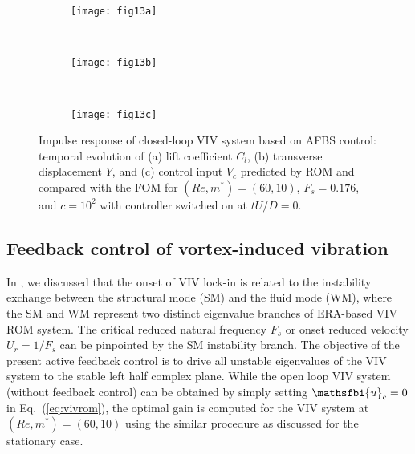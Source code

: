 \documentclass[standard]{jfm}
\begin{document}
\begin{figure}
\centering
\begin{subfigure}[b]{\columnwidth}
\centering
  \texttt{[image: fig13a]}
    \caption{}
    \label{fig:viv_val_cl} 
    \end{subfigure}  \\
\begin{subfigure}[b]{\columnwidth}
\centering
  \texttt{[image: fig13b]}
    \caption{}
    \label{fig:viv_val_y} 
    \end{subfigure}   \\
\begin{subfigure}[b]{\columnwidth} 
\centering
  \texttt{[image: fig13c]}
	\caption{}
	\label{fig:viv_val_uc}
	\end{subfigure}	
        \caption{Impulse response of closed-loop VIV system based on AFBS control: temporal evolution of 
        (a) lift coefficient $C_l$, 
        (b) transverse displacement $Y$, and 
        (c) control input $V_c$ predicted by ROM and compared with the FOM 
        for $(Re,m^*)=(60,10)$, $F_s=0.176$, and $c=10^2$ with controller switched on at $tU/D=0$.}
        \label{fig:viv_val}
\end{figure}

\subsection{Feedback control of vortex-induced vibration}\label{sec:VIV}
In \cite{YaoJFM2016}, we discussed that the onset of VIV lock-in is related to 
the instability exchange between the structural mode (SM) and the fluid mode (WM),
where the SM and WM represent two distinct eigenvalue branches of ERA-based VIV ROM system.
The critical reduced natural frequency $F_s$ or onset reduced velocity $U_r=1/F_s$ can be pinpointed 
by the SM instability branch. The objective of the present active feedback control 
is to drive all unstable eigenvalues  of the VIV system to the stable left
half complex plane. 
%
While the open loop VIV system (without feedback control) can be obtained 
by simply setting $\mathsfbi{u}_c=0$ in Eq.~(\ref{eq:vivrom}), 
the optimal gain is computed for the VIV system 
at $(Re,m^*)=(60,10)$ using the similar procedure as discussed for the stationary case. 
\end{document}
